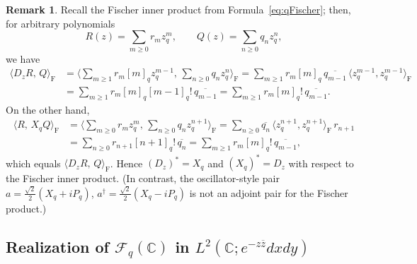 \documentclass[10pt]{amsart}
\theoremstyle{plain}
\theoremstyle{definition}
\newtheorem{remark}[theorem]{Remark}
\renewcommand{\bar}[1]{\overline{#1}}
\def\ge{\geqslant}
\begin{document}
\begin{remark}
Recall the Fischer inner product from Formula~\eqref{eq:qFischer}; then, for arbitrary polynomials
\[
R(z)=\sum_{m\ge0} r_m z_q^m,\qquad Q(z)=\sum_{n\ge0} q_n z_q^n,
\]
we have
\[
\begin{aligned}
\langle D_z R,\,Q\rangle_{\mathrm F}
&=\Big\langle \sum_{m\ge1} r_m [m]_q z_q^{m-1},\,\sum_{n\ge0} q_n z_q^n\Big\rangle_{\mathrm F}
=\sum_{m\ge1} r_m [m]_q \,\overline{q_{m-1}}\,\langle z_q^{m-1},z_q^{m-1}\rangle_{\mathrm F}\\
&=\sum_{m\ge1} r_m [m]_q [m-1]_q!\,\overline{q_{m-1}}
=\sum_{m\ge1} r_m [m]_q!\,\overline{q_{m-1}}.
\end{aligned}
\]
On the other hand,
\[
\begin{aligned}
\langle R,\,X_q Q\rangle_{\mathrm F}
&=\Big\langle \sum_{m\ge0} r_m z_q^m,\,\sum_{n\ge0} q_n z_q^{n+1}\Big\rangle_{\mathrm F}
=\sum_{n\ge0} \overline{q_n}\,\langle z_q^{n+1},z_q^{n+1}\rangle_{\mathrm F}\,r_{n+1}\\
&=\sum_{n\ge0} r_{n+1}[n+1]_q!\,\overline{q_n}
=\sum_{m\ge1} r_m [m]_q!\,\overline{q_{m-1}},
\end{aligned}
\]
which equals $\langle D_z R,\,Q\rangle_{\mathrm F}$. Hence $(D_z)^\ast=X_q$ and $(X_q)^\ast=D_z$
with respect to the Fischer inner product. (In contrast, the oscillator-style pair
$a=\tfrac{\sqrt2}{2}(X_q+iP_q)$, $a^\dagger=\tfrac{\sqrt2}{2}(X_q-iP_q)$ 
is {not} an adjoint pair for the Fischer product.)
\end{remark}






\subsection{Realization of $\mathcal{F}_q(\mathbb{C})$  in $L^{2}(\mathbb{C}; e^{-z\bar z} dxdy)$}\label{secL2}
\end{document}
